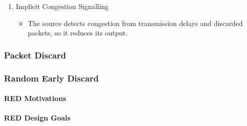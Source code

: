 \begin{definition}
\begin{enumerate}[noitemsep]
\item Implicit Congestion Signalling
  \begin{itemize}[noitemsep]
  \item The source detects congestion from transmission delays and discarded packets, so it reduces its output.
  \end{itemize}
\end{enumerate}

\subsubsection{Packet Discard}\label{subsubsec:Packet_Discard}
\end{definition}

\subsubsection{Random Early Discard}\label{subsubsec:Random_Early_Discard}
\paragraph{RED Motivations}\label{par:Random_Early_Discard_Motivations}
\paragraph{RED Design Goals}\label{par:Random_Early_Discard_Design_Goals}
